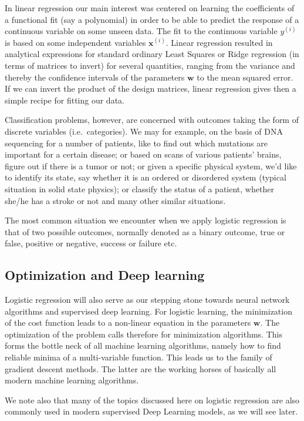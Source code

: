 \documentclass[%
oneside,                 %
final,                   %
10pt]{article}
\begin{document}
In linear regression our main interest was centered on learning the
coefficients of a functional fit (say a polynomial) in order to be
able to predict the response of a continuous variable on some unseen
data. The fit to the continuous variable $y^{(i)}$ is based on some
independent variables $\boldsymbol{x}^{(i)}$. Linear regression resulted in
analytical expressions for standard ordinary Least Squares or Ridge
regression (in terms of matrices to invert) for several quantities,
ranging from the variance and thereby the confidence intervals of the
parameters $\boldsymbol{w}$ to the mean squared error. If we can invert
the product of the design matrices, linear regression gives then a
simple recipe for fitting our data.


Classification problems, however, are concerned with outcomes taking
the form of discrete variables (i.e.~categories). We may for example,
on the basis of DNA sequencing for a number of patients, like to find
out which mutations are important for a certain disease; or based on
scans of various patients' brains, figure out if there is a tumor or
not; or given a specific physical system, we'd like to identify its
state, say whether it is an ordered or disordered system (typical
situation in solid state physics); or classify the status of a
patient, whether she/he has a stroke or not and many other similar
situations.

The most common situation we encounter when we apply logistic
regression is that of two possible outcomes, normally denoted as a
binary outcome, true or false, positive or negative, success or
failure etc.

\subsection{Optimization and Deep learning}

Logistic regression will also serve as our stepping stone towards
neural network algorithms and supervised deep learning. For logistic
learning, the minimization of the cost function leads to a non-linear
equation in the parameters $\boldsymbol{w}$. The optimization of the
problem calls therefore for minimization algorithms. This forms the
bottle neck of all machine learning algorithms, namely how to find
reliable minima of a multi-variable function. This leads us to the
family of gradient descent methods. The latter are the working horses
of basically all modern machine learning algorithms.

We note also that many of the topics discussed here on logistic 
regression are also commonly used in modern supervised Deep Learning
models, as we will see later.
\end{document}
